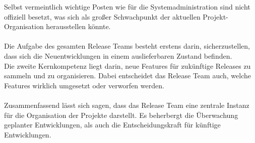 Selbst vermeintlich wichtige Posten wie für die Systemadministration sind nicht offiziell besetzt, was sich als großer Schwachpunkt der aktuellen Projekt-Organisation herausstellen könnte.\\ \\
Die Aufgabe des gesamten Release Teams besteht erstens darin, sicherzustellen, dass sich die Neuentwicklungen in einem auslieferbaren Zustand befinden.\\
Die zweite Kernkompetenz liegt darin, neue Features für zukünftige Releases zu sammeln und zu organisieren. Dabei entscheidet das Release Team auch, welche Features wirklich umgesetzt oder verworfen werden. \cite{KDEReleaseTeam} \\ \\
Zusammenfassend lässt sich sagen, dass das Release Team eine zentrale Instanz für die Organisation der Projekte darstellt. Es beherbergt die Überwachung geplanter Entwicklungen, als auch die Entscheidungskraft für künftige Entwicklungen.

